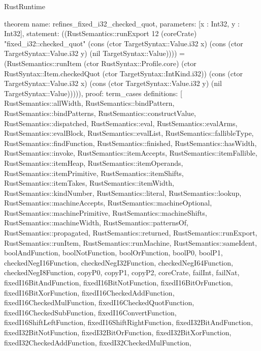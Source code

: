 \begin{lexlean}{RustRuntime}
\begin{semanticmodule}
theorem{
  name: refines_fixed_i32_checked_quot,
  parameters: [x : Int32, y : Int32],
  statement: ((RustSemantics::runExport 12 (coreCrate) "fixed_i32::checked_quot" (cons (ctor TargetSyntax::Value.i32 x) (cons (ctor TargetSyntax::Value.i32 y) (nil TargetSyntax::Value)))) = (RustSemantics::runItem (ctor RustSyntax::Profile.core) (ctor RustSyntax::Item.checkedQuot (ctor TargetSyntax::IntKind.i32)) (cons (ctor TargetSyntax::Value.i32 x) (cons (ctor TargetSyntax::Value.i32 y) (nil TargetSyntax::Value))))),
  proof: term_cases{
    definitions: [
      RustSemantics::allWidth,
      RustSemantics::bindPattern,
      RustSemantics::bindPatterns,
      RustSemantics::constructValue,
      RustSemantics::dispatched,
      RustSemantics::eval,
      RustSemantics::evalArms,
      RustSemantics::evalBlock,
      RustSemantics::evalList,
      RustSemantics::fallibleType,
      RustSemantics::findFunction,
      RustSemantics::finished,
      RustSemantics::hasWidth,
      RustSemantics::invoke,
      RustSemantics::itemAccepts,
      RustSemantics::itemFallible,
      RustSemantics::itemHeap,
      RustSemantics::itemOperands,
      RustSemantics::itemPrimitive,
      RustSemantics::itemShifts,
      RustSemantics::itemTakes,
      RustSemantics::itemWidth,
      RustSemantics::kindNumber,
      RustSemantics::literal,
      RustSemantics::lookup,
      RustSemantics::machineAccepts,
      RustSemantics::machineOptional,
      RustSemantics::machinePrimitive,
      RustSemantics::machineShifts,
      RustSemantics::machineWidth,
      RustSemantics::patternsOf,
      RustSemantics::propagated,
      RustSemantics::returned,
      RustSemantics::runExport,
      RustSemantics::runItem,
      RustSemantics::runMachine,
      RustSemantics::sameIdent,
      boolAndFunction,
      boolNotFunction,
      boolOrFunction,
      boolP0,
      boolP1,
      checkedNegI16Function,
      checkedNegI32Function,
      checkedNegI64Function,
      checkedNegI8Function,
      copyP0,
      copyP1,
      copyP2,
      coreCrate,
      failInt,
      failNat,
      fixedI16BitAndFunction,
      fixedI16BitNotFunction,
      fixedI16BitOrFunction,
      fixedI16BitXorFunction,
      fixedI16CheckedAddFunction,
      fixedI16CheckedMulFunction,
      fixedI16CheckedQuotFunction,
      fixedI16CheckedSubFunction,
      fixedI16ConvertFunction,
      fixedI16ShiftLeftFunction,
      fixedI16ShiftRightFunction,
      fixedI32BitAndFunction,
      fixedI32BitNotFunction,
      fixedI32BitOrFunction,
      fixedI32BitXorFunction,
      fixedI32CheckedAddFunction,
      fixedI32CheckedMulFunction,
}}
\end{semanticmodule}
\end{lexlean}
